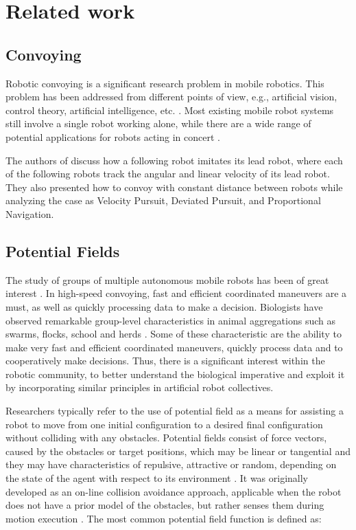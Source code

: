 \chapter{Related work}
\section{Convoying}
Robotic convoying is a significant research problem in mobile robotics. This problem has been addressed from different points of view, e.g., artificial vision, control theory, artificial intelligence, etc. \cite{article:convoy_comm}. Most existing mobile robot systems still involve a single robot working alone, while there are a wide range of potential applications for robots acting in concert \cite{article:convoy_comm}.

The authors of \cite{article:guidance_control} discuss how a following robot imitates its lead robot, where each of the following robots track the angular and linear velocity of its lead robot. They also presented how to convoy with constant distance between robots while analyzing the case as Velocity Pursuit, Deviated Pursuit, and Proportional Navigation.

\section{Potential Fields}
The study of groups of multiple autonomous mobile robots has been of great interest \cite{article:motion_planning_apf}. In high-speed convoying, fast and efficient coordinated maneuvers are a must, as well as quickly processing data to make a decision. Biologists have observed remarkable group-level characteristics in animal aggregations such as swarms, flocks, school and herds \cite{article:motion_planning_apf}. Some of these characteristic are the ability to make very fast and efficient coordinated maneuvers, quickly process data and to cooperatively make decisions. Thus, there is a significant interest within the robotic community, to better understand the biological imperative and exploit it by incorporating similar principles in artificial robot collectives.  

Researchers typically refer to the use of potential field as a means for assisting a robot to move from one initial configuration to a desired final configuration without colliding with any obstacles. Potential fields consist of force vectors, caused by the obstacles or target positions, which may be linear or tangential and they may have characteristics of repulsive, attractive or random, depending on the state of the agent with respect to its environment \cite{article:apf}. It was originally developed as an on-line collision avoidance approach, applicable when the robot does not have a prior model of the obstacles, but rather senses them during motion execution \cite{article:real_time_avoidance_manip}. The most common potential field function is defined as:

